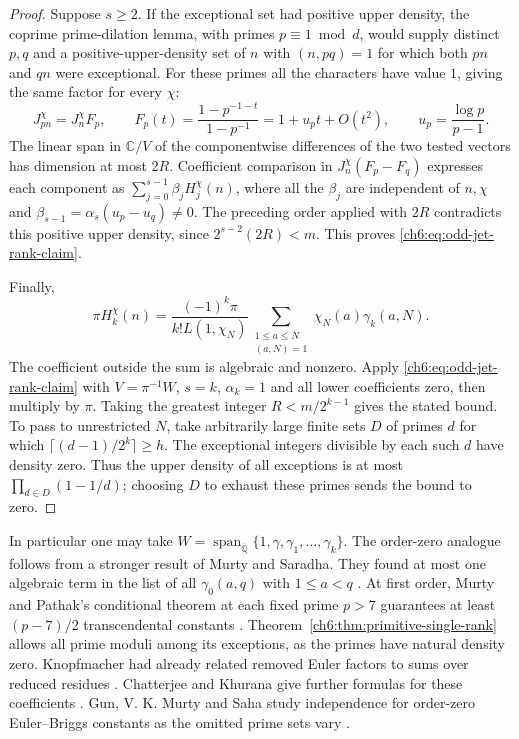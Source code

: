 \documentclass[11pt,a4paper,oneside,openany]{report}
\theoremstyle{remark}\newtheorem{remark}[theorem]{Remark}
\numberwithin{equation}{section}
\begin{document}
\begin{proof}
Suppose $s\ge2$. If the exceptional set had positive upper density,
the coprime prime-dilation lemma, with primes $p\equiv1\bmod d$, would
supply distinct $p,q$ and a positive-upper-density set of $n$ with
$(n,pq)=1$ for which both $pn$ and $qn$ were exceptional. For these
primes all the characters have value $1$, giving the same factor
for every $\chi$:
\[
 J_{pn}^\chi=J_n^\chi F_p,\qquad
 F_p(t)=\frac{1-p^{-1-t}}{1-p^{-1}}
       =1+u_pt+O(t^2),\qquad u_p=\frac{\log p}{p-1}.
\]
The linear span in $\mathbb C/V$ of the componentwise differences of
the two tested vectors has dimension at most $2R$. Coefficient comparison
in $J_n^\chi(F_p-F_q)$ expresses each component as
$\sum_{j=0}^{s-1}\beta_jH_j^\chi(n)$, where all the $\beta_j$ are
independent of $n,\chi$ and $\beta_{s-1}=\alpha_s(u_p-u_q)\ne0$.
The preceding order applied with $2R$ contradicts this positive upper
density, since $2^{s-2}(2R)<m$. This proves
\eqref{ch6:eq:odd-jet-rank-claim}.

Finally,
\[
 \pi H_k^\chi(n)=\frac{(-1)^k\pi}{k!L(1,\chi_N)}
     \sum_{\substack{1\le a\le N\\(a,N)=1}}
                         \chi_N(a)\gamma_k(a,N).
\]
The coefficient outside the sum is algebraic and nonzero. Apply
\eqref{ch6:eq:odd-jet-rank-claim} with $V=\pi^{-1}W$, $s=k$,
$\alpha_k=1$ and all lower coefficients zero, then multiply by $\pi$.
Taking the greatest integer $R<m/2^{k-1}$ gives the stated bound.
To pass to unrestricted $N$, take arbitrarily large finite sets $D$ of
primes $d$ for which $\lceil(d-1)/2^k\rceil\ge h$. The exceptional
integers divisible by each such $d$ have density zero. Thus the upper
density of all exceptions is at most $\prod_{d\in D}(1-1/d)$; choosing
$D$ to exhaust these primes sends the bound to zero.
\end{proof}

In particular one may take $W=\operatorname{span}_{\overline{\mathbb Q}}\{1,\gamma,\gamma_1,\ldots,\gamma_k\}$. The order-zero analogue follows from a stronger result of Murty and Saradha. They found at most one algebraic term in the list of all $\gamma_0(a,q)$ with $1\le a<q$ \cite[Theorem~1]{ms}. At first order, Murty and Pathak's conditional theorem at each fixed prime $p>7$ guarantees at least $(p-7)/2$ transcendental constants \cite[Corollary~2]{mp}. Theorem~\ref{ch6:thm:primitive-single-rank} allows all prime moduli among its exceptions, as the primes have natural density zero. Knopfmacher had already related removed Euler factors to sums over reduced residues \cite[Prop.~3.4]{knop}. Chatterjee and Khurana give further formulas for these coefficients \cite{ck}. Gun, V. K. Murty and Saha study independence for order-zero Euler--Briggs constants as the omitted prime sets vary \cite{gms}.
\end{document}

